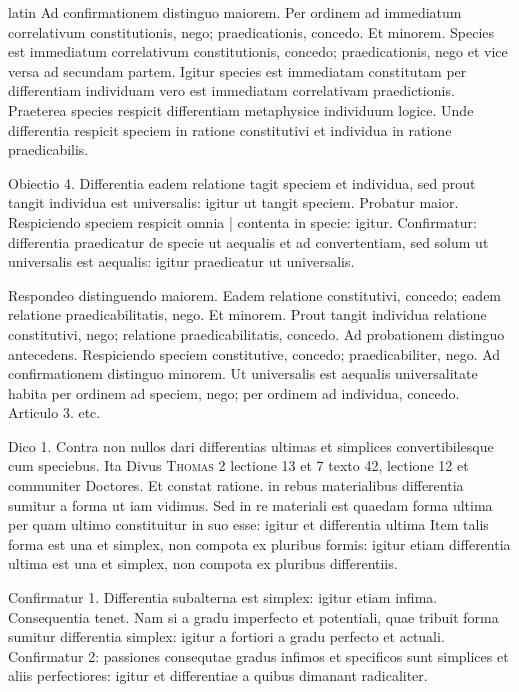 \begin{otherlanguage*}{latin}
\pstart
Ad confirmationem distinguo maiorem. Per ordinem ad immediatum correlativum constitutionis, nego; praedicationis, concedo. Et minorem. Species est immediatum correlativum constitutionis, concedo; praedicationis, nego et vice versa ad secundam partem. Igitur species est immediatam constitutam per differentiam individuam vero est immediatam correlativam praedictionis. Praeterea species respicit differentiam metaphysice individuum logice. Unde differentia respicit speciem in ratione constitutivi et individua in ratione praedicabilis. 
\pend

\pstart
Obiectio 4. Differentia eadem relatione tagit speciem et individua, sed prout tangit individua est universalis:
igitur ut tangit speciem. Probatur maior. Respiciendo speciem respicit omnia \textnormal{|} contenta in specie:
igitur. Confirmatur:
differentia praedicatur de specie ut aequalis et ad convertentiam, sed solum ut universalis est aequalis:
igitur praedicatur ut universalis. 
\pend

\pstart
Respondeo distinguendo maiorem. Eadem relatione constitutivi, concedo; eadem relatione praedicabilitatis, nego. Et minorem. Prout tangit individua relatione constitutivi, nego; relatione praedicabilitatis, concedo. Ad probationem distinguo antecedens. Respiciendo speciem constitutive, concedo; praedicabiliter, nego. Ad confirmationem distinguo minorem. Ut universalis est aequalis universalitate habita per ordinem ad speciem, nego; per ordinem ad individua, concedo. Articulo 3. etc. 
\pend

\pstart
{}
\pend

\pstart
Dico 1. Contra non nullos dari differentias ultimas et simplices convertibilesque cum speciebus. Ita Divus \textsc{Thomas} 2  lectione 13 et 7  texto 42, lectione 12 et communiter Doctores. Et constat ratione. in rebus materialibus differentia sumitur a forma ut iam vidimus. Sed in re materiali est quaedam forma ultima per quam ultimo constituitur in suo esse:
igitur et differentia ultima Item talis forma est una et simplex, non compota ex pluribus formis:
igitur etiam differentia ultima est una et simplex, non compota ex pluribus differentiis. 
\pend

\pstart
Confirmatur 1. Differentia subalterna est simplex:
igitur etiam infima. Consequentia tenet. Nam si a gradu imperfecto et potentiali, quae tribuit forma sumitur differentia simplex:
igitur a fortiori a gradu perfecto et actuali. Confirmatur 2:
passiones consequtae gradus infimos et specificos sunt simplices et aliis perfectiores:
igitur et differentiae a quibus dimanant radicaliter. 
\pend


\end{otherlanguage*}
